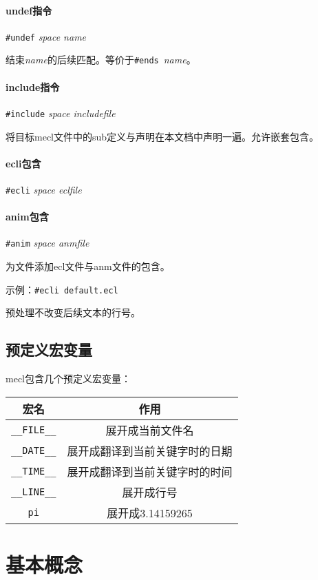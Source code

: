\documentclass[UTF8]{ctexart}
\begin{document}
\paragraph{undef指令} \verb|#undef| \textit{space name}

结束\textit{name}的后续匹配。等价于\verb|#ends|\ \textit{name}。

\paragraph{include指令} \verb|#include| \textit{space includefile}

将目标mecl文件中的sub定义与声明在本文档中声明一遍。允许嵌套包含。

\paragraph{ecli包含} \verb|#ecli| \textit{space eclfile}
\paragraph{anim包含} \verb|#anim| \textit{space anmfile}

为文件添加ecl文件与anm文件的包含。

示例：\verb|#ecli default.ecl|

预处理不改变后续文本的行号。

\subsection{预定义宏变量}

mecl包含几个预定义宏变量：

\begin{table}[H]
	\centering
	\begin{tabular}{c|c}
		\hline
		宏名 & 作用 \\\hline
		\verb|__FILE__| & 展开成当前文件名 \\\hline
		\verb|__DATE__| & 展开成翻译到当前关键字时的日期 \\\hline
		\verb|__TIME__| & 展开成翻译到当前关键字时的时间 \\\hline
		\verb|__LINE__| & 展开成行号 \\\hline
		\verb|pi| & 展开成3.14159265 \\\hline
	\end{tabular}
\end{table}

\section{基本概念}
\end{document}
